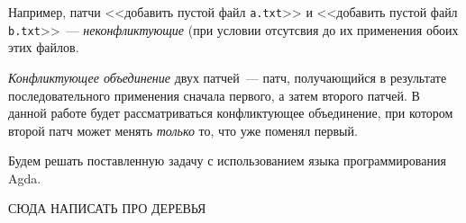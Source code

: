 Например, патчи <<добавить пустой файл \texttt{a.txt}>> и <<добавить
пустой файл \texttt{b.txt}>>~--- \emph{неконфликтующие} (при условии
отсутсвия до их применения обоих этих файлов.

\begin{definition}
  \emph{Конфликтующее объединение} двух патчей~--- патч, получающийся
  в результате последовательного применения сначала первого, а затем
  второго патчей. В данной работе будет рассматриваться конфликтующее
  объединение, при котором второй патч может менять \emph{только} то,
  что уже поменял первый.
\end{definition}

Будем решать поставленную задачу с использованием языка
программирования Agda. 

СЮДА НАПИСАТЬ ПРО ДЕРЕВЬЯ
